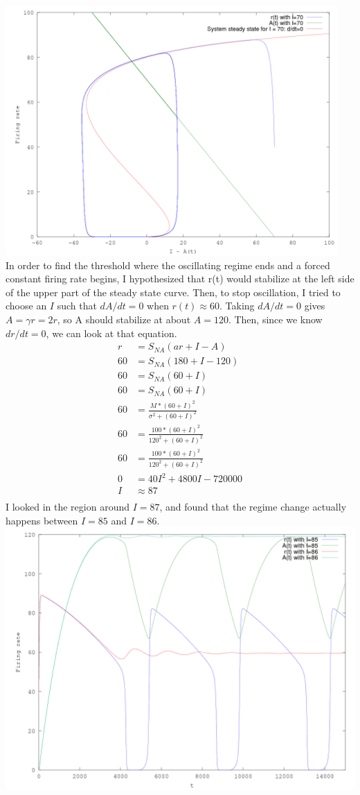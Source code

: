 \documentclass[11pt]{article}
\begin{document}
\includegraphics[width=5in]{4pc.png}\\
In order to find the threshold where the oscillating regime ends
and a forced constant firing rate begins,
I hypothesized that r(t) would stabilize
at the left side of the upper part of the steady state curve.
Then, to stop oscillation, I tried to choose an $I$ such that
$dA/dt = 0$ when $r(t) \approx 60$. 
Taking $dA/dt = 0$ gives $A = \gamma r=2r$, so A should stabilize at about $A=120$.
Then, since we know $dr/dt=0$, we can look at that equation.
\begin{align*}
r &= S_{NA}(ar+I-A)\\
60 &= S_{NA}(180+I-120)\\
60 &= S_{NA}(60+I)\\
60 &= S_{NA}(60+I)\\
60 &= \frac{M*(60+I)^2}{\sigma^2 + (60 + I)^2}\\
60 &= \frac{100*(60+I)^2}{120^2 + (60 + I)^2}\\
60 &= \frac{100*(60+I)^2}{120^2 + (60 + I)^2}\\
0 &= 40I^2 + 4800I -720000 \\
I &\approx 87\\
\end{align*}
I looked in the region around $I=87$, and found that
the regime change actually happens between $I=85$ and $I=86$.\\
\includegraphics[width=6in]{5.png}\\
\end{document}
